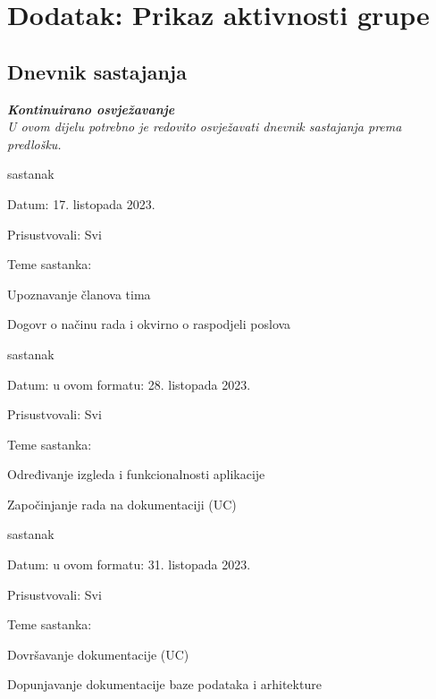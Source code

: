 \chapter*{Dodatak: Prikaz aktivnosti grupe}
		
		\section*{Dnevnik sastajanja}
		
		\textbf{\textit{Kontinuirano osvježavanje}}\\
		
		 \textit{U ovom dijelu potrebno je redovito osvježavati dnevnik sastajanja prema predlošku.}
		
		\begin{packed_enum}
			\item  sastanak
			
			\item[] \begin{packed_item}
				\item Datum: 17. listopada 2023.
				\item Prisustvovali: Svi
				\item Teme sastanka:
				\begin{packed_item}
					\item  Upoznavanje članova tima
					\item  Dogovr o načinu rada i okvirno o raspodjeli poslova
				\end{packed_item}
			\end{packed_item}
			
			\item  sastanak
			\item[] \begin{packed_item}
				\item Datum: u ovom formatu: 28. listopada 2023.
				\item Prisustvovali: Svi
				\item Teme sastanka:
				\begin{packed_item}
					\item  Određivanje izgleda i funkcionalnosti aplikacije
					\item  Započinjanje rada na dokumentaciji (UC)
				\end{packed_item}
			\end{packed_item}

			\item  sastanak
			\item[] \begin{packed_item}
				\item Datum: u ovom formatu: 31. listopada 2023.
				\item Prisustvovali: Svi
				\item Teme sastanka:
				\begin{packed_item}
					\item  Dovršavanje dokumentacije (UC)
					\item  Dopunjavanje dokumentacije baze podataka i arhitekture
				\end{packed_item}
			\end{packed_item}
			

\end{packed_enum}
